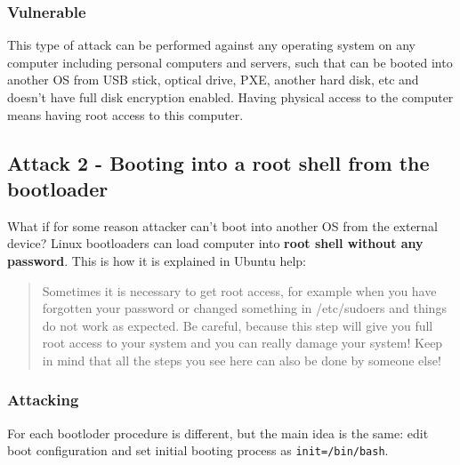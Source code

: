 \subsubsection*{Vulnerable}
This type of attack can be performed against any operating system on any computer including personal computers and servers, such that can be booted into another OS from USB stick, optical drive, PXE, another hard disk, etc and doesn't have full disk encryption enabled. Having physical access to the computer means having root access to this computer.

\subsection{Attack 2 - Booting into a root shell from the bootloader}
What if for some reason attacker can't boot into another OS from the external device? Linux bootloaders can load computer into \textbf{root shell without any password}. This is how it is explained in Ubuntu help:
\begin{quote}
Sometimes it is necessary to get root access, for example when you have forgotten your password or changed something in /etc/sudoers and things do not work as expected.  Be careful, because this step will give you full root access to your system and you can really damage your system! Keep in mind that all the steps you see here can also be done by someone else!\cite{bootloader-reset-root} 
\end{quote}

\subsubsection*{Attacking}
For each bootloder procedure is different, but the main idea is the same: edit boot configuration and set initial booting process as \texttt{init=/bin/bash}.

